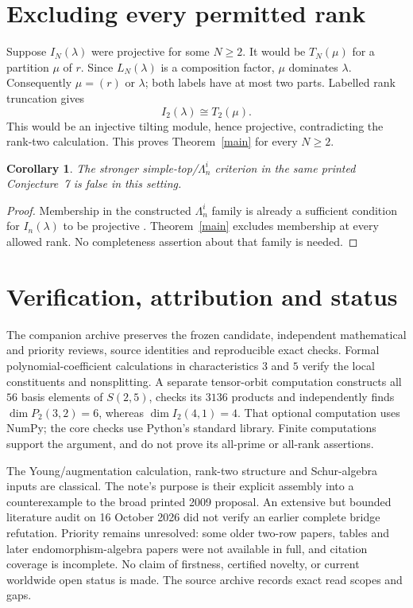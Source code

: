 \documentclass[11pt]{article}
\newtheorem{corollary}{Corollary}
\begin{document}
\section{Excluding every permitted rank}
Suppose \(I_N(\lambda)\) were projective for some \(N\ge2\).
It would be \(T_N(\mu)\) for a partition \(\mu\) of \(r\).
Since \(L_N(\lambda)\) is a composition factor, \(\mu\) dominates \(\lambda\).
Consequently \(\mu=(r)\) or \(\lambda\); both labels have at most two parts.
Labelled rank truncation gives
\[
 I_2(\lambda)\cong T_2(\mu).
\]
This would be an injective tilting module, hence projective, contradicting
the rank-two calculation. This proves Theorem~\ref{main} for every \(N\ge2\).

\begin{corollary}
The stronger simple-top/\(\Lambda_n^i\) criterion in the same printed
Conjecture~7 is false in this setting.
\end{corollary}
\begin{proof}
Membership in the constructed \(\Lambda_n^i\) family is already a sufficient
condition for \(I_n(\lambda)\) to be projective \cite{DD,M}.
Theorem~\ref{main} excludes membership at every allowed rank.
No completeness assertion about that family is needed.
\end{proof}

\section{Verification, attribution and status}
The companion archive preserves the frozen candidate, independent
mathematical and priority reviews, source identities and reproducible exact
checks. Formal polynomial-coefficient calculations in characteristics
\(3\) and \(5\) verify the local constituents and nonsplitting.
A separate tensor-orbit computation constructs all \(56\) basis elements
of \(S(2,5)\), checks its \(3136\) products and independently finds
\(\dim P_2(3,2)=6\), whereas \(\dim I_2(4,1)=4\).
That optional computation uses NumPy; the core checks use Python's standard
library. Finite computations support the argument, and do not prove its
all-prime or all-rank assertions.

The Young/augmentation calculation, rank-two structure and Schur-algebra
inputs are classical. The note's purpose is their explicit assembly into
a counterexample to the broad printed 2009 proposal.
An extensive but bounded literature audit on 16 October 2026 did not
verify an earlier complete bridge refutation. Priority remains unresolved:
some older two-row papers, tables and later endomorphism-algebra papers
were not available in full, and citation coverage is incomplete.
No claim of firstness, certified novelty, or current worldwide open status
is made. The source archive records exact read scopes and gaps.
\end{document}
